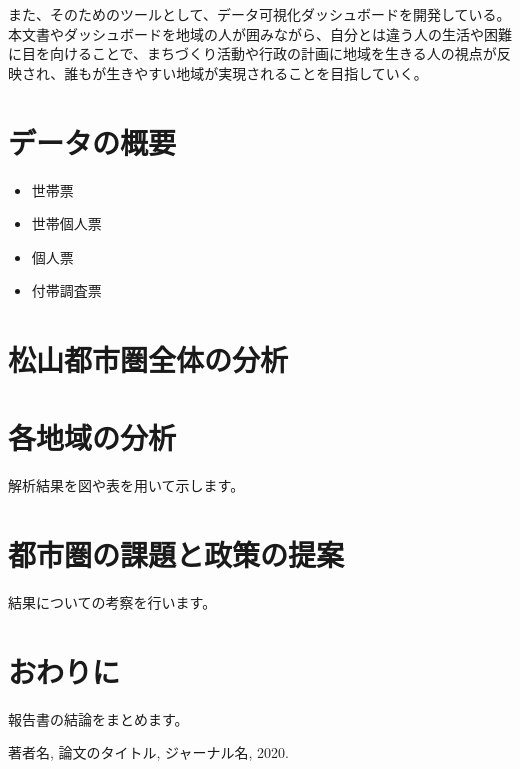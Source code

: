 \documentclass[a4paper,12pt]{jsbook}
\begin{document}
また、そのためのツールとして、データ可視化ダッシュボードを開発している。
本文書やダッシュボードを地域の人が囲みながら、自分とは違う人の生活や困難に目を向けることで、まちづくり活動や行政の計画に地域を生きる人の視点が反映され、誰もが生きやすい地域が実現されることを目指していく。


\chapter{データの概要}
\begin{itemize}
  \item 世帯票
  \item 世帯個人票
  \item 個人票
  \item 付帯調査票
\end{itemize}


\chapter{松山都市圏全体の分析}


\chapter{各地域の分析}
解析結果を図や表を用いて示します。

\chapter{都市圏の課題と政策の提案}
結果についての考察を行います。

\chapter{おわりに}
報告書の結論をまとめます。

\begin{thebibliography}{9}
著者名,
論文のタイトル,
ジャーナル名,
2020.
\end{thebibliography}
\end{document}
